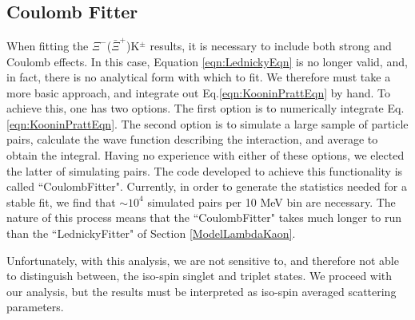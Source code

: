 \documentclass[/home/jesse/Analysis/FemtoAnalysis/AnalysisNotes/AnalysisNoteJBuxton.tex]{subfiles}
\begin{document}
\subsection{Coulomb Fitter}
\label{CoulombFitter}

When fitting the $\Xi^{-}$($\bar{\Xi}^{+}$)K$^{\pm}$ results, it is necessary to include both strong and Coulomb effects.
In this case, Equation \ref{eqn:LednickyEqn} is no longer valid, and, in fact, there is no analytical form with which to fit.
We therefore must take a more basic approach, and integrate out Eq.\ref{eqn:KooninPrattEqn} by hand.
To achieve this, one has two options.  The first option is to numerically integrate Eq.\ref{eqn:KooninPrattEqn}.  The second option is to simulate a large sample of particle pairs, calculate the  wave function describing the interaction, and average to obtain the integral.  Having no experience with either of these options, we elected the latter of simulating pairs.
The code developed to achieve this functionality is called ``CoulombFitter".
Currently, in order to generate the statistics needed for a stable fit, we find that $\sim 10^{4}$ simulated pairs per 10 MeV bin are necessary.
The nature of this process means that the ``CoulombFitter" takes much longer to run than the ``LednickyFitter" of Section \ref{ModelLambdaKaon}.


Unfortunately, with this analysis, we are not sensitive to, and therefore not able to distinguish between, the iso-spin singlet and triplet states.  We proceed with our analysis, but the results must be interpreted as iso-spin averaged scattering parameters.

\begin{comment}
\begin{equation}
\begin{array}{l}
\vspace{2mm}
  C(\mathbf{k^{*}}) = \sum\limits_{S}\rho_{S}\int S(\mathbf{r^{*}})|\Psi^{S}_{\mathbf{k^{*}}}(\mathbf{r^{*}})|^{2}d^{3}\mathbf{r^{*}} \\
\vspace{3mm}
  ~~~~~\Psi_{\mathbf{k^{*}}}(\mathbf{r^{*}}) = e^{i\delta_{c}}\sqrt{A_{c}(\eta)}[e^{i\mathbf{k^{*}} \cdot \mathbf{r^{*}}}F(-i\eta,1,i\xi) + f_{c}(k^{*})\frac{\tilde{G}(\rho,\eta)}{r^{*}}] \\
\vspace{3mm}
  ~~~~~f_{c}(k^{*}) = [\frac{1}{f_{0}} + \frac{1}{2}d_{0}k^{*2} - \frac{2}{a_{c}}h(\eta) - ik^{*}A_{c}(\eta)]^{-1} \\
\vspace{3mm}
  ~~~~~\rho = k^{*}r^{*};~ \eta = (k^{*}a)^{-1};~ a_{c} = (\mu z_{1}z_{2}e^{2})^{-1} \\  
\vspace{2mm}
  ~~~~~\xi = \mathbf{k^{*}} \cdot \mathbf{r^{*}} + k^{*}r^{*} \equiv \rho(1+\cos\theta^{*}) \\
\end{array}
\label{eqn:CoulombEqn}
\end{equation}
\end{comment}
\end{document}
